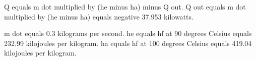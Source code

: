 Q equals m dot multiplied by (he minus ha) minus Q out.  
Q out equals m dot multiplied by (he minus ha) equals negative 37.953 kilowatts.  

m dot equals 0.3 kilograms per second.  
he equals hf at 90 degrees Celsius equals 232.99 kilojoules per kilogram.  
ha equals hf at 100 degrees Celsius equals 419.04 kilojoules per kilogram.